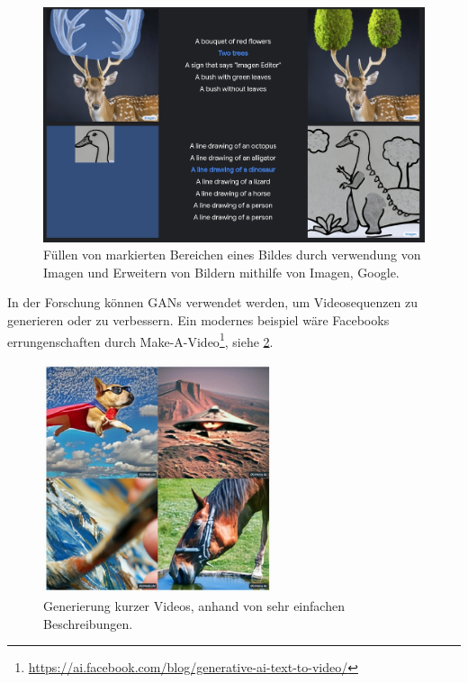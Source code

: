         \begin{figure}[!h]
          \centering
          \begin{minipage}[b]{0.6\textwidth}
            \includegraphics[width=\textwidth]{img/imagen_google_fill_and_extend.jpg}
          \end{minipage}
          \hfill
          \begin{minipage}[b]{0.35\textwidth}
            \caption{Füllen von markierten Bereichen eines Bildes durch verwendung von Imagen und Erweitern von Bildern mithilfe von Imagen, Google.}
          \end{minipage}
          \label{fig:extend_image_imagen}
        \end{figure}

        \newpage 

        In der Forschung können GANs verwendet werden, um Videosequenzen zu generieren oder zu verbessern. Ein modernes beispiel wäre Facebooks errungenschaften durch Make-A-Video\footnote{\url{https://ai.facebook.com/blog/generative-ai-text-to-video/}}, siehe \ref{fig:facebook_make_a_video}.

        \begin{figure}[!h]
            \centering
            \includegraphics[width=0.6\textwidth]{img/facebook_make_a_video.jpg}
            \caption{Generierung kurzer Videos, anhand von sehr einfachen Beschreibungen.}
            \label{fig:facebook_make_a_video}
        \end{figure}
        
